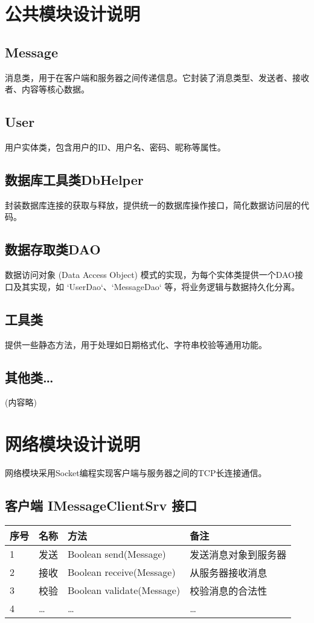 \documentclass[a4paper]{ctexart}
\begin{document}
\section{公共模块设计说明}
\subsection{Message}
消息类，用于在客户端和服务器之间传递信息。它封装了消息类型、发送者、接收者、内容等核心数据。

\subsection{User}
用户实体类，包含用户的ID、用户名、密码、昵称等属性。

\subsection{数据库工具类DbHelper}
封装数据库连接的获取与释放，提供统一的数据库操作接口，简化数据访问层的代码。

\subsection{数据存取类DAO}
数据访问对象 (Data Access Object) 模式的实现，为每个实体类提供一个DAO接口及其实现，如 `UserDao`、`MessageDao` 等，将业务逻辑与数据持久化分离。

\subsection{工具类}
提供一些静态方法，用于处理如日期格式化、字符串校验等通用功能。

\subsection{其他类…}
(内容略)

\section{网络模块设计说明}
网络模块采用Socket编程实现客户端与服务器之间的TCP长连接通信。

\subsection{客户端 IMessageClientSrv 接口}
\begin{tabular}{llll}
    \toprule
    \textbf{序号} & \textbf{名称} & \textbf{方法}               & \textbf{备注} \\
    \midrule
    1           & 发送          & Boolean send(Message)     & 发送消息对象到服务器  \\
    2           & 接收          & Boolean receive(Message)  & 从服务器接收消息    \\
    3           & 校验          & Boolean validate(Message) & 校验消息的合法性    \\
    4           & …           & …                         & …           \\
    \bottomrule
\end{tabular}
\end{document}
